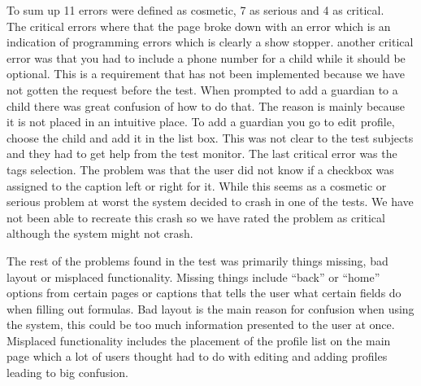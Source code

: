 To sum up 11 errors were defined as cosmetic, 7 as serious and 4 as critical. \\

The critical errors where that the page broke down with an error which is an indication of programming errors which is clearly a show stopper. another critical error was that you had to include a phone number for a child while it should be optional. This is a requirement that has not been implemented because we have not gotten the request before the test. When prompted to add a guardian to a child there was great confusion of how to do that. The reason is mainly because it is not placed in an intuitive place. To add a guardian you go to edit profile, choose the child and add it in the list box. This was not clear to the test subjects and they had to get help from the test monitor. The last critical error was the tags selection. The problem was that the user did not know if a checkbox was assigned to the caption left or right for it. While this seems as a cosmetic or serious problem at worst the system decided to crash in one of the tests. We have not been able to recreate this crash so we have rated the problem as critical although the system might not crash.

The rest of the problems found in the test was primarily things missing, bad layout or misplaced functionality. Missing things include ``back'' or ``home'' options from certain pages or captions that tells the user what certain fields do when filling out formulas. Bad layout is the main reason for confusion when using the system, this could be too much information presented to the user at once. Misplaced functionality includes the placement of the profile list on the main page which a lot of users thought had to do with editing and adding profiles leading to big confusion. 